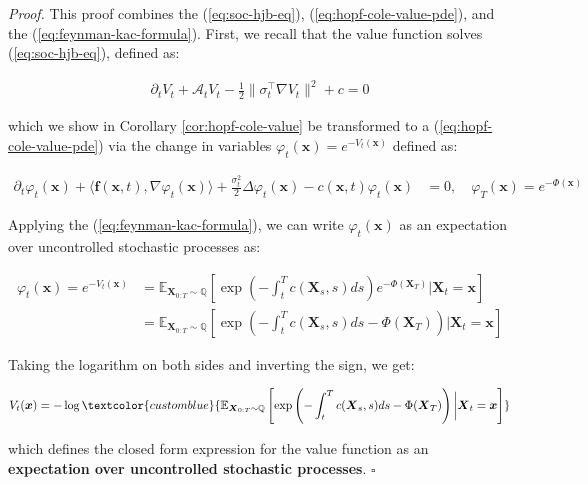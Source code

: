\documentclass{article}
\newcommand{\bluetext}[1]{\textcolor{customblue}{#1}}
\begin{document}
\textit{Proof.} This proof combines the (\ref{eq:soc-hjb-eq}), (\ref{eq:hopf-cole-value-pde}), and the (\ref{eq:feynman-kac-formula}). First, we recall that the value function solves (\ref{eq:soc-hjb-eq}), defined as:
\begin{small}
\begin{align}
    \partial_tV_t+\mathcal{A}_t V_t-\frac{1}{2}\|\sigma_t^\top\nabla V_t\|^2+c =0
\end{align}
\end{small}
which we show in Corollary \ref{cor:hopf-cole-value} be transformed to a (\ref{eq:hopf-cole-value-pde}) via the change in variables $\varphi_t(\boldsymbol{x})=e^{-V_t(\boldsymbol{x})}$ defined as:
\begin{small}
\begin{align}
    \partial_t\varphi_t(\boldsymbol{x})+\langle\boldsymbol{f}(\boldsymbol{x},t), \nabla \varphi_t(\boldsymbol{x})\rangle+\frac{\sigma_t^2}{2}\Delta\varphi_t(\boldsymbol{x})-c(\boldsymbol{x},t)\varphi_t(\boldsymbol{x})&=0, \quad \varphi_T(\boldsymbol{x})=e^{-\Phi(\boldsymbol{x})}
\end{align}
\end{small}
Applying the (\ref{eq:feynman-kac-formula}), we can write $\varphi_t(\boldsymbol{x})$ as an expectation over uncontrolled stochastic processes as:
\begin{small}
\begin{align}
    \varphi_t(\boldsymbol{x})=e^{-V_t(\boldsymbol{x})}&=\mathbb{E}_{\boldsymbol{X}_{0:T}\sim\mathbb{Q}}\left[\exp\left(-\int_t^Tc(\boldsymbol{X}_s,s)ds \right)e^{-\Phi(\boldsymbol{X}_T)}\bigg|\boldsymbol{X}_t=\boldsymbol{x}\right]\nonumber\\
    &=\mathbb{E}_{\boldsymbol{X}_{0:T}\sim\mathbb{Q}}\left[\exp\left(-\int_t^Tc(\boldsymbol{X}_s,s)ds-\Phi(\boldsymbol{X}_T) \right)\bigg|\boldsymbol{X}_t=\boldsymbol{x}\right]
\end{align}
\end{small}
Taking the logarithm on both sides and inverting the sign, we get:
\begin{small}
\begin{align}
    V_t(\boldsymbol{x})=-\log \bluetext{\mathbb{E}_{\boldsymbol{X}_{0:T}\sim\mathbb{Q}}\left[\exp\left(-\int_t^Tc(\boldsymbol{X}_s,s)ds-\Phi(\boldsymbol{X}_T) \right)\bigg|\boldsymbol{X}_t=\boldsymbol{x}\right]}
\end{align}
\end{small}
which defines the closed form expression for the value function as an \textbf{expectation over uncontrolled stochastic processes}. \hfill $\square$
\end{document}
